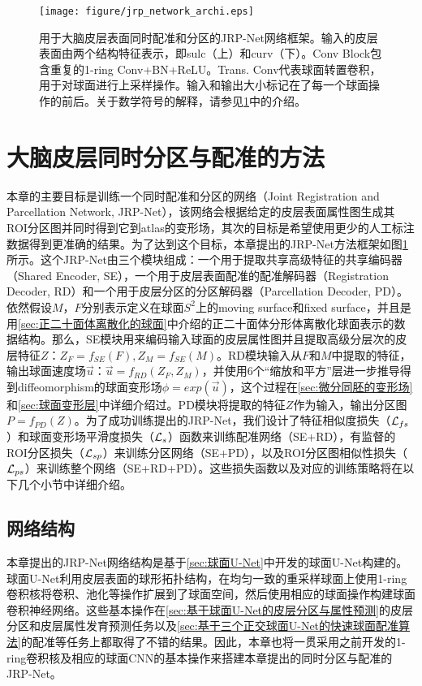 \begin{figure}[t]
	\centering
	\texttt{[image: figure/jrp\_network\_archi.eps]}
	\caption{用于大脑皮层表面同时配准和分区的JRP-Net网络框架。输入的皮层表面由两个结构特征表示，即sulc（上）和curv（下）。Conv Block包含重复的1-ring Conv+BN+ReLU。Trans. Conv代表球面转置卷积，用于对球面进行上采样操作。输入和输出大小标记在了每一个球面操作的前后。关于数学符号的解释，请参见\ref{sec:大脑皮层同时分区与配准的网络结构}中的介绍。}\label{fig:jrp_network_archi}
\end{figure}

\section{大脑皮层同时分区与配准的方法}\label{sec:大脑皮层同时分区与配准的网络结构}
本章的主要目标是训练一个同时配准和分区的网络（Joint Registration and Parcellation Network, JRP-Net），该网络会根据给定的皮层表面属性图生成其ROI分区图并同时得到它到atlas的变形场，其次的目标是希望使用更少的人工标注数据得到更准确的结果。为了达到这个目标，本章提出的JRP-Net方法框架如图\ref{fig:jrp_network_archi}所示。这个JRP-Net由三个模块组成：一个用于提取共享高级特征的共享编码器（Shared Encoder, SE），一个用于皮层表面配准的配准解码器（Registration Decoder, RD）和一个用于皮层分区的分区解码器（Parcellation Decoder, PD）。依然假设$M$，$F$分别表示定义在球面$S^2$上的moving surface和fixed surface，并且是用\ref{sec:正二十面体离散化的球面}中介绍的正二十面体分形体离散化球面表示的数据结构\cite{fischl2012freesurfer}。那么，SE模块用来编码输入球面的皮层属性图并且提取高级分层次的皮层特征$Z$：$Z_F=f_{SE}(F), Z_M=f_{SE}(M)$。RD模块输入从$F$和$M$中提取的特征，输出球面速度场$\overrightarrow{u}$：$\overrightarrow{u}=f_{RD}(Z_F,Z_M)$，并使用6个“缩放和平方”层进一步推导得到diffeomorphism的球面变形场$\phi=exp(\overrightarrow{u})$，这个过程在\ref{sec:微分同胚的变形场}和\ref{sec:球面变形层}中详细介绍过。PD模块将提取的特征$Z$作为输入，输出分区图$P=f_{PD}(Z)$。为了成功训练提出的JRP-Net，我们设计了特征相似度损失（${\cal L}_{fs}$）和球面变形场平滑度损失（${\cal L}_s$）函数来训练配准网络（SE+RD），有监督的ROI分区损失（${\cal L}_{sp}$）来训练分区网络（SE+PD），以及ROI分区图相似性损失（${\cal L}_{ps}$）来训练整个网络（SE+RD+PD）。这些损失函数以及对应的训练策略将在以下几个小节中详细介绍。

\subsection{网络结构}\label{sec:大脑皮层同时分区与配准的网络结构2.1}
本章提出的JRP-Net网络结构是基于\ref{sec:球面U-Net}中开发的球面U-Net构建的。球面U-Net利用皮层表面的球形拓扑结构，在均匀一致的重采样球面上使用1-ring卷积核将卷积、池化等操作扩展到了球面空间，然后使用相应的球面操作构建球面卷积神经网络。这些基本操作在\ref{sec:基于球面U-Net的皮层分区与属性预测}的皮层分区和皮层属性发育预测任务以及\ref{sec:基于三个正交球面U-Net的快速球面配准算法}的配准等任务上都取得了不错的结果。因此，本章也将一贯采用之前开发的1-ring卷积核及相应的球面CNN的基本操作来搭建本章提出的同时分区与配准的JRP-Net。

